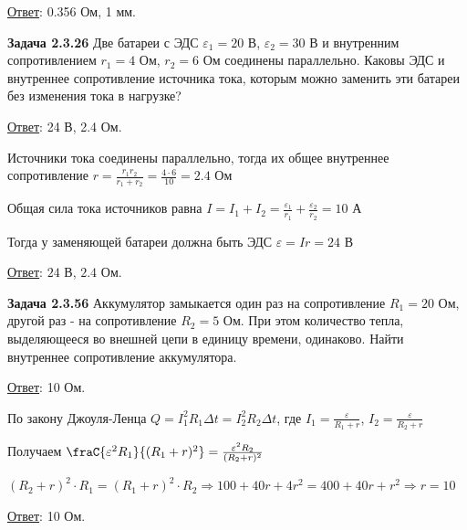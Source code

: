 \documentclass[12pt]{article}
\begin{document}
\bigvspace

\underline{Ответ}: 0.356 Ом, 1 мм.

\begin{tcolorbox}
    \textbf{Задача 2.3.26} Две батареи с ЭДС $\varepsilon_1 = 20$ В, $\varepsilon_2 = 30$ В и внутренним
    сопротивлением $r_1 = 4$ Ом, $r_2 = 6$ Ом соединены параллельно. Каковы
    ЭДС и внутреннее сопротивление источника тока, которым можно заменить 
    эти батареи без изменения тока в нагрузке?

    \begin{UpsideDown}
        \footnotesize
        \underline{Ответ}: 24 В, 2.4 Ом.
    \end{UpsideDown}
\end{tcolorbox}

Источники тока соединены параллельно, тогда их общее внутреннее сопротивление $r = \frac{r_1 r_2}{r_1 + r_2} = \frac{4 \cdot 6}{10}= 2.4$ Ом

Общая сила тока источников равна $I = I_1 + I_2 = \frac{\varepsilon_1}{r_1} + \frac{\varepsilon_2}{r_2} = 10$ А

Тогда у заменяющей батареи должна быть ЭДС $\varepsilon = Ir = 24$ В

\bigvspace

\underline{Ответ}: $24$ В, $2.4$ Ом.


\begin{tcolorbox}
    \textbf{Задача 2.3.56} Аккумулятор замыкается один раз на сопротивление $R_1 = 20$ Ом, 
    другой раз - на сопротивление $R_2 = 5$ Ом. При этом количество
    тепла, выделяющееся во внешней цепи в единицу времени, одинаково.
    Найти внутреннее сопротивление аккумулятора.
    
    \begin{UpsideDown}
        \footnotesize
        \underline{Ответ}: 10 Ом.
    \end{UpsideDown}
\end{tcolorbox}

По закону Джоуля-Ленца $Q = I_1^2 R_1 \Delta t = I_2^2 R_2 \Delta t$, где $I_1 = \frac{\varepsilon}{R_1 + r}$, $I_2 = \frac{\varepsilon}{R_2 + r}$

Получаем $\fraC{\varepsilon^2 R_1}{(R_1 + r)^2} = \frac{\varepsilon^2 R_2}{(R_2 + r)^2}$

$(R_2 + r)^2 \cdot R_1 = (R_1 + r)^2 \cdot R_2 \Longrightarrow 100 + 40r + 4r^2 = 400 + 40r + r^2 \Longrightarrow r = 10$

\bigvspace

\underline{Ответ}: 10 Ом.

\end{document}
